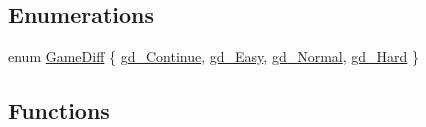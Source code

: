 \subsection*{Enumerations}
\begin{DoxyCompactItemize}
\item 
enum \hyperlink{ID__US_8H_aaf1c9f1ca500faf979469b42245b8e06}{GameDiff} \{ \hyperlink{ID__US_8H_aaf1c9f1ca500faf979469b42245b8e06acc0e1f50a6bc8ed59670fb0cce0f4045}{gd\_\-Continue}, 
\hyperlink{ID__US_8H_aaf1c9f1ca500faf979469b42245b8e06afb20abdea78e90da6d584db6e1da0dc7}{gd\_\-Easy}, 
\hyperlink{ID__US_8H_aaf1c9f1ca500faf979469b42245b8e06a7b04daf569cb442bb94a8a37d073a560}{gd\_\-Normal}, 
\hyperlink{ID__US_8H_aaf1c9f1ca500faf979469b42245b8e06a5ab4f1b1ce58ced5654a20d270c421ea}{gd\_\-Hard}
 \}
\end{DoxyCompactItemize}
\subsection*{Functions}
